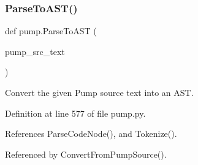 \subsubsection{\texorpdfstring{Parse\+To\+A\+S\+T()}{ParseToAST()}}
{\footnotesize\ttfamily def pump.\+Parse\+To\+A\+ST (\begin{DoxyParamCaption}\item[{}]{pump\+\_\+src\+\_\+text }\end{DoxyParamCaption})}

\begin{DoxyVerb}Convert the given Pump source text into an AST.\end{DoxyVerb}
 

Definition at line 577 of file pump.\+py.



References Parse\+Code\+Node(), and Tokenize().



Referenced by Convert\+From\+Pump\+Source().


